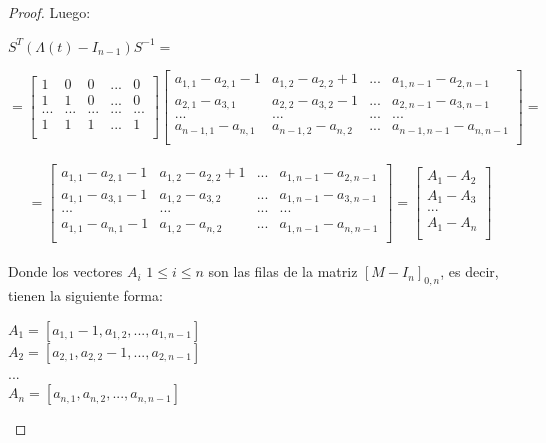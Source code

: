 \documentclass[14pt]{extarticle}
\begin{document}
\begin{lem}
\begin{proof}
	           Luego:	          
	           \begin{center}
	            	$  S^{T}(\Lambda(t) - I_{n-1})S^{-1} =$
	           \end{center}
	           \[ = \begin{bmatrix}
	           1 & 0 & 0 &... & 0 \\
	           1 & 1 & 0 &...  & 0\\
	           ... & ... & ...& ... & ... \\		
	           1 & 1 & 1 & ... & 1\\
	           \end{bmatrix}
	           \begin{bmatrix}
	           a_{1,1}-a_{2,1}-1 & a_{1,2}-a_{2,2}+1 & ... & a_{1,n-1}-a_{2,n-1}  \\
	           a_{2,1}-a_{3,1} & a_{2,2}-a_{3,2}-1&... &  a_{2,n-1}-a_{3,n-1} \\
	           ... & ... & ... & ... \\	
	           a_{n-1,1}-a_{n,1} & a_{n-1,2}-a_{n,2}&... &  a_{n-1,n-1}-a_{n,n-1} \\
	           \end{bmatrix}=\]\\
	           
	           \[ = \begin{bmatrix}
	           a_{1,1}-a_{2,1}-1 & a_{1,2}-a_{2,2}+1 & ... & a_{1,n-1}-a_{2,n-1}  \\
	           a_{1,1}-a_{3,1}-1 & a_{1,2}-a_{3,2}&... &  a_{1,n-1}-a_{3,n-1} \\
	           ... & ... & ... & ... \\	
	           a_{1,1}-a_{n,1}-1 & a_{1,2}-a_{n,2}&... &  a_{1,n-1}-a_{n,n-1} \\
	           \end{bmatrix} =
	           \begin{bmatrix}
	           A_{1} - A_{2} \\
	           A_{1} - A_{3} \\
	           ... \\	
	           A_{1} - A_{n} \\
	           \end{bmatrix}\]\\
	           
	           Donde los vectores $A_{i} $ $ 1 \le i \le n $ son las filas de la matriz $[M-I_{n}]_{0,n}$, es decir, tienen la siguiente forma:
			   \begin{center}
		           $ A_{1} = [a_{1,1}-1, a_{1,2},...,a_{1,n-1}] $\\
	               $ A_{2} = [a_{2,1}, a_{2,2}-1,...,a_{2,n-1}] $\\
	               ...\\
	               $ A_{n} = [a_{n,1}, a_{n,2},...,a_{n,n-1}] $\\
		       \end{center}
	           

\end{proof}
\end{lem}
\end{document}
